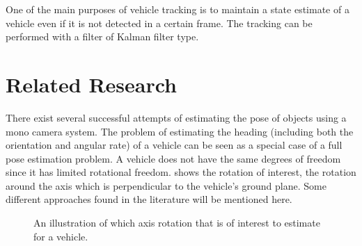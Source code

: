 One of the main purposes of vehicle tracking is to maintain a state estimate of a vehicle even if it is not detected in a certain frame.
The tracking can \eg be performed with a filter of Kalman filter \cite{Sivaraman:2013} type.

\section{Related Research}
\label{sec:relatedresearch}
There exist several successful attempts of estimating the  pose of objects using a mono camera system.
The problem of estimating the heading (including both the orientation and angular rate) of a vehicle can be seen as a special case of a full  pose estimation problem.
A vehicle does not have the same degrees of freedom since it has limited rotational freedom.
 shows the rotation of interest, \ie the rotation around the axis which is perpendicular to the vehicle's ground plane.
Some different approaches found in the literature will be mentioned here.

\begin{figure}[!ht]
	\centering
	\caption{\label{fig:vehiclerotation} An illustration of which axis rotation that is of interest to estimate for a vehicle.}
\end{figure}

